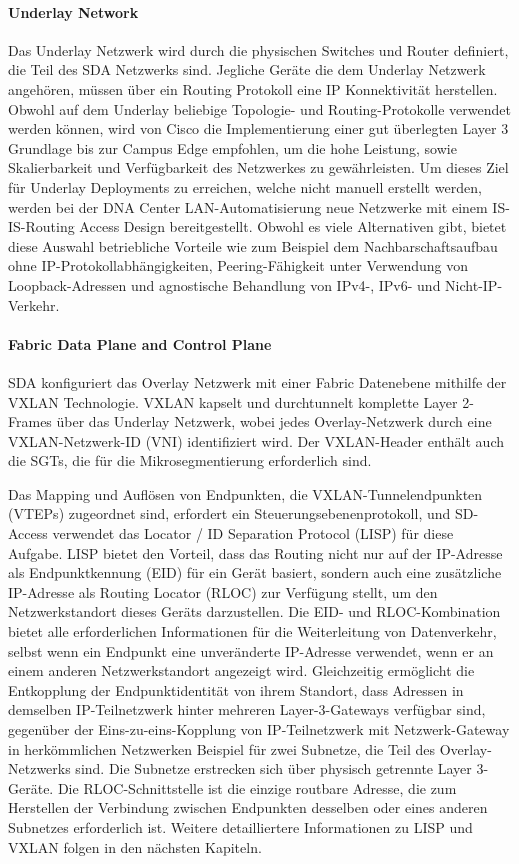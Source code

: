 \paragraph{Underlay Network}
Das Underlay Netzwerk wird durch die physischen Switches und Router definiert, die Teil des SDA Netzwerks sind. Jegliche Geräte die dem Underlay Netzwerk angehören, müssen über ein Routing Protokoll eine IP Konnektivität herstellen. Obwohl auf dem Underlay beliebige Topologie- und Routing-Protokolle verwendet werden können, wird von Cisco die Implementierung einer gut überlegten Layer 3 Grundlage bis zur Campus Edge empfohlen, um die hohe Leistung, sowie Skalierbarkeit und Verfügbarkeit des Netzwerkes zu gewährleisten. 
Um dieses Ziel für Underlay Deployments zu erreichen, welche nicht manuell erstellt werden, werden bei der DNA Center LAN-Automatisierung neue Netzwerke mit einem IS-IS-Routing Access Design bereitgestellt. Obwohl es viele Alternativen gibt, bietet diese Auswahl betriebliche Vorteile wie zum Beispiel dem Nachbarschaftsaufbau ohne IP-Protokollabhängigkeiten, Peering-Fähigkeit unter Verwendung von Loopback-Adressen und agnostische Behandlung von IPv4-, IPv6- und Nicht-IP-Verkehr. \cite{sda-designguide}

\paragraph{Fabric Data Plane and Control Plane}
SDA konfiguriert das Overlay Netzwerk mit einer Fabric Datenebene mithilfe der VXLAN Technologie. VXLAN kapselt und durchtunnelt komplette Layer 2-Frames über das Underlay Netzwerk, wobei jedes Overlay-Netzwerk durch eine VXLAN-Netzwerk-ID (VNI) identifiziert wird. Der VXLAN-Header enthält auch die SGTs, die für die Mikrosegmentierung erforderlich sind.

Das Mapping und Auflösen von Endpunkten, die VXLAN-Tunnelendpunkten (VTEPs) zugeordnet sind, erfordert ein Steuerungsebenenprotokoll, und SD-Access verwendet das Locator / ID Separation Protocol (LISP) für diese Aufgabe. LISP bietet den Vorteil, dass das Routing nicht nur auf der IP-Adresse als Endpunktkennung (EID) für ein Gerät basiert, sondern auch eine zusätzliche IP-Adresse als Routing Locator (RLOC) zur Verfügung stellt, um den Netzwerkstandort dieses Geräts darzustellen. Die EID- und RLOC-Kombination bietet alle erforderlichen Informationen für die Weiterleitung von Datenverkehr, selbst wenn ein Endpunkt eine unveränderte IP-Adresse verwendet, wenn er an einem anderen Netzwerkstandort angezeigt wird. Gleichzeitig ermöglicht die Entkopplung der Endpunktidentität von ihrem Standort, dass Adressen in demselben IP-Teilnetzwerk hinter mehreren Layer-3-Gateways verfügbar sind, gegenüber der Eins-zu-eins-Kopplung von IP-Teilnetzwerk mit Netzwerk-Gateway in herkömmlichen Netzwerken Beispiel für zwei Subnetze, die Teil des Overlay-Netzwerks sind. Die Subnetze erstrecken sich über physisch getrennte Layer 3-Geräte. Die RLOC-Schnittstelle ist die einzige routbare Adresse, die zum Herstellen der Verbindung zwischen Endpunkten desselben oder eines anderen Subnetzes erforderlich ist. Weitere detailliertere Informationen zu LISP und VXLAN folgen in den nächsten Kapiteln. \cite{sda-designguide} \\


